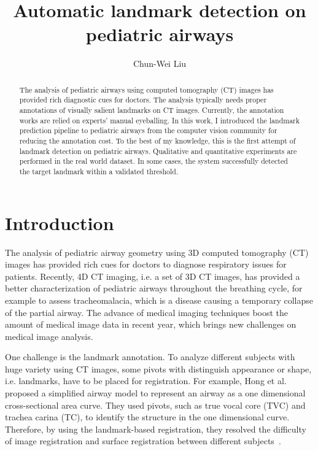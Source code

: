 \documentclass{article}
\begin{document}
\title{Automatic landmark detection on pediatric airways}
\author{Chun-Wei Liu}
\maketitle              %

\begin{abstract}
The analysis of pediatric airways using computed tomography (CT) images has provided rich diagnostic cues for doctors. The analysis typically needs proper annotations of visually salient landmarks on CT images. Currently, the annotation works are relied on experts' manual eyeballing. In this work, I introduced the landmark prediction pipeline to pediatric airways from the computer vision community for reducing the annotation cost. To the best of my knowledge, this is the first attempt of landmark detection on pediatric airways. Qualitative and quantitative experiments are performed in the real world dataset. In some cases, the system successfully detected the target landmark within a validated threshold.
\end{abstract}

\section{Introduction}
\label{sec:intro}

The analysis of pediatric airway geometry using 3D computed tomography (CT) images has provided rich cues for doctors to diagnose respiratory issues for patients.
Recently, 4D CT imaging, i.e. a set of 3D CT images, has provided a better characterization of pediatric airways throughout the breathing cycle, for example to assess tracheomalacia, which is a disease causing a temporary collapse of the partial airway.
The advance of medical imaging techniques boost the amount of medical image data in recent year, which brings new challenges on medical image analysis.

One challenge is the landmark annotation.
To analyze different subjects with huge variety using CT images, some pivots with distinguish appearance or shape, i.e. landmarks, have to be placed for registration.
For example, Hong et al. proposed a simplified airway model to represent an airway as a one dimensional cross-sectional area curve.
They used pivots, such as true vocal core (TVC) and trachea carina (TC), to identify the structure in the one dimensional curve.
Therefore, by using the landmark-based registration, they resolved the difficulty of image registration and surface registration between different subjects~\cite{hong2014statistical}.
\end{document}
